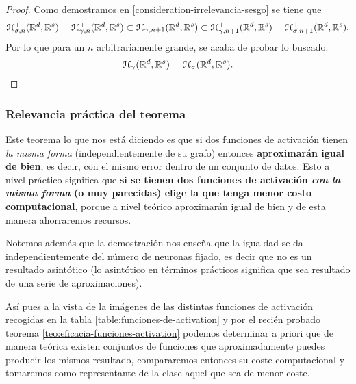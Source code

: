 \begin{aportacionOriginal}
\begin{proof}
    Como demostramos en \ref{consideration-irrelevancia-sesgo} se tiene que 
    \begin{equation*}
        \mathcal{H}^+_{\sigma, n}(\mathbb{R}^d, \mathbb{R}^s) = \mathcal{H}^+_{\gamma, n}(\mathbb{R}^d, \mathbb{R}^s) 
        \subset 
            \mathcal{H}_{\gamma, n+1}(\mathbb{R}^d, \mathbb{R}^s) 
        \subset
        \mathcal{H}^+_{\gamma, {n+1}}(\mathbb{R}^d, \mathbb{R}^s) = \mathcal{H}^+_{\sigma, {n+1}}(\mathbb{R}^d, \mathbb{R}^s) 
        .
    \end{equation*}
    Por lo que para un $n$ arbitrariamente grande, se acaba de probar lo buscado. 
    \begin{equation*}
        \mathcal{H}_{\gamma}(\mathbb{R}^d, \mathbb{R}^s) = \mathcal{H}_{\sigma}(\mathbb{R}^d, \mathbb{R}^s).
    \end{equation*}
\end{proof}
\end{aportacionOriginal}

\subsubsection*{Relevancia práctica del teorema}
Este teorema lo que nos está diciendo es que si dos funciones de activación tienen \textit{la misma forma}
(independientemente de su grafo)
entonces \textbf{aproximarán igual de bien},
es decir, con el mismo error dentro de un conjunto de datos.
 Esto a nivel práctico  significa que \textbf{si se tienen dos funciones de activación
  \textit{con la misma forma} (o muy parecidas) elige
   la que tenga menor costo computacional}, porque a 
   nivel teórico aproximarán igual de bien y de esta
    manera ahorraremos recursos. 

Notemos además que la demostración nos enseña que la igualdad se da independientemente del número de 
neuronas fijado, es decir que no es un resultado 
asintótico (lo asintótico en términos prácticos 
significa que sea resultado de una serie de 
aproximaciones).  


Así pues a la vista de la imágenes de las distintas funciones de activación 
recogidas en la tabla \ref{table:funciones-de-activation} y
por el recién probado teorema \ref{teo:eficacia-funciones-activation} podemos determinar a priori 
que de manera teórica existen conjuntos de funciones que aproximadamente  puedes producir los mismos resultado, 
compararemos entonces su coste computacional y tomaremos como representante de la clase aquel que sea de menor coste. 

